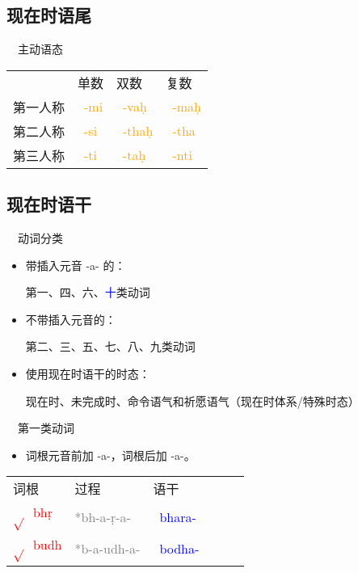 \documentclass[17pt]{beamer}
\newcommand{\skt}[1]{{\sanskritfont{#1}}} %
\newcommand{\verbroot}[1]{\textcolor{red}{$\sqrt{}$#1}}
\newcommand{\sktroot}[1]{{\verbroot{\skt{#1}}}}
\newcommand{\skttransroot}[1]{{\sktroot{#1}~\textcolor{red}{#1}}}
\newcommand{\verbstem}[1]{\textcolor{blue}{#1\nobreakdash-}}
\newcommand{\sktverbstem}[1]{{\textcolor{blue}{\skt{#1\nobreakdash-}}}}
\newcommand{\skttransverbstem}[1]{{\sktverbstem{#1}~\verbstem{#1}}}
\newcommand{\wordending}[1]{\textcolor{Orange}{\nobreakdash-#1}}
\newcommand{\sktending}[1]{{\textcolor{Orange}{\skt{-#1}}}}
\newcommand{\skttransending}[1]{{\sktending{#1}~\wordending{#1}}}
\newcommand{\notsoimportant}[1]{\textcolor{gray}{#1}}
\begin{document}
\subsection{现在时语尾}
\begin{frame}{\insertsubsection ~~主动语态}
  \small
  \centering
  \begin{tabular}{@{}llll@{}} %
    & 单数  & 双数  & 复数 \\
    第一人称 & \skttransending{mi} & \skttransending{vaḥ}  & \skttransending{maḥ}  \\
    第二人称 & \skttransending{si} & \skttransending{thaḥ} & \skttransending{tha}   \\
    第三人称 & \skttransending{ti} & \skttransending{taḥ} & \skttransending{nti}  \\
  \end{tabular}   
\end{frame}

\subsection{现在时语干}
\begin{frame}{\insertsubsection ~~动词分类}
  \begin{itemize}
    \item
      带插入元音 \nobreakdash-a\nobreakdash- 的：
      
      第一、四、六、\textcolor{blue}{十}类动词
    \item
      不带插入元音的：
      
      第二、三、五、七、八、九类动词
    \item
      使用现在时语干的时态：
      
      现在时、未完成时、命令语气和祈愿语气（现在时体系/特殊时态）
  \end{itemize}  
\end{frame}

\begin{frame}{\insertsubsection ~~第一类动词}
  \small
  \begin{itemize}
    \item
      词根元音前加 \nobreakdash-a\nobreakdash-，词根后加 \nobreakdash-a\nobreakdash-。
  \end{itemize} 

  \centering
  \begin{tabular}{@{}llllll@{}} %
    词根 & 过程 & 语干  \\
    \skttransroot{bhṛ} & \notsoimportant{*bh-a-ṛ-a-} & \skttransverbstem{bhara}  \\
    \skttransroot{budh} & \notsoimportant{*b-a-udh-a-} & \skttransverbstem{bodha}  \\
  \end{tabular}

\end{frame}
\end{document}
